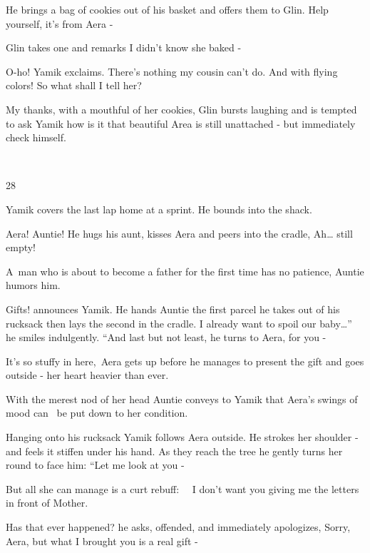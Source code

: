 \documentclass[12pt]{book}
\begin{document}
He brings a bag of cookies out of his basket and offers them to Glin. {\textquotedbl}Help yourself, it's from Aera
-{\textquotedbl}

Glin takes one and remarks {\textquotedbl}I didn't know she baked -{\textquotedbl}

{\textquotedbl}O-ho!{\textquotedbl} Yamik exclaims. {\textquotedbl}There's nothing my cousin can't do. And with flying
colors! So what shall I tell her?{\textquotedbl}

{\textquotedbl}My thanks, with a mouthful of her cookies,{\textquotedbl} Glin bursts laughing and is tempted to ask
Yamik how is it that beautiful Area is still unattached - but immediately check himself.

~

28~~~~~~~~~~~~~~

Yamik covers the last lap home at a sprint. He bounds into the shack.

{\textquotedbl}Aera! Auntie!{\textquotedbl} He hugs his aunt, kisses Aera and peers into the cradle,
{\textquotedbl}Ah{\dots} still empty!{\textquotedbl}

{\textquotedbl}A~man who is about to become a father for the first time has no patience,{\textquotedbl} Auntie humors
him.

{\textquotedbl}Gifts!{\textquotedbl} announces Yamik. He hands Auntie the first parcel he takes out of his rucksack then
lays the second in the cradle. {\textquotedbl}I already want to spoil our baby{\dots}'' he smiles indulgently. ``And
last but not least,{\textquotedbl} he turns to Aera, {\textquotedbl}for you -{\textquotedbl}

{\textquotedbl}It's so stuffy in here,{\textquotedbl}~Aera gets up before he manages to present the gift and goes
outside - her heart heavier than ever.

With the merest nod of her head Auntie conveys to Yamik that Aera's swings of mood can \ be put down to her condition.

Hanging onto his rucksack Yamik follows Aera outside. He strokes her shoulder - and feels it stiffen under his hand. As
they reach the tree he gently turns her round to face him: ``Let me look at you -{\textquotedbl}

But all she can manage is a curt rebuff: \ \ {\textquotedbl}I don't want you giving me the letters in front of
Mother.{\textquotedbl}

{\textquotedbl}Has that ever happened?{\textquotedbl} he asks, offended, and immediately apologizes,
{\textquotedbl}Sorry, Aera, but what I brought you is a real gift -{\textquotedbl}
\end{document}
